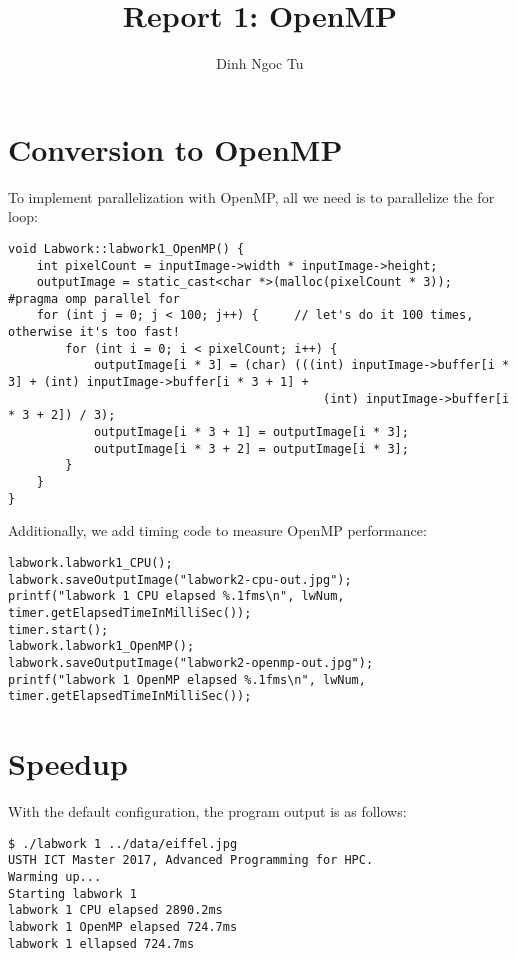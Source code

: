 \documentclass[12pt]{article}
\title{Report 1: OpenMP}
\author{Dinh Ngoc Tu}
\begin{document}
\maketitle


\section{Conversion to OpenMP}

To implement parallelization with OpenMP, all we need is to parallelize the for loop:

\begin{lstlisting}[breaklines]
void Labwork::labwork1_OpenMP() {
    int pixelCount = inputImage->width * inputImage->height;
    outputImage = static_cast<char *>(malloc(pixelCount * 3));
#pragma omp parallel for
    for (int j = 0; j < 100; j++) {     // let's do it 100 times, otherwise it's too fast!
        for (int i = 0; i < pixelCount; i++) {
            outputImage[i * 3] = (char) (((int) inputImage->buffer[i * 3] + (int) inputImage->buffer[i * 3 + 1] +
                                            (int) inputImage->buffer[i * 3 + 2]) / 3);
            outputImage[i * 3 + 1] = outputImage[i * 3];
            outputImage[i * 3 + 2] = outputImage[i * 3];
        }
    }
}
\end{lstlisting}

Additionally, we add timing code to measure OpenMP performance:

\begin{lstlisting}[breaklines]
labwork.labwork1_CPU();
labwork.saveOutputImage("labwork2-cpu-out.jpg");
printf("labwork 1 CPU elapsed %.1fms\n", lwNum, timer.getElapsedTimeInMilliSec());
timer.start();
labwork.labwork1_OpenMP();
labwork.saveOutputImage("labwork2-openmp-out.jpg");
printf("labwork 1 OpenMP elapsed %.1fms\n", lwNum, timer.getElapsedTimeInMilliSec());
\end{lstlisting}


\section{Speedup}

With the default configuration, the program output is as follows:

\begin{lstlisting}[breaklines]
$ ./labwork 1 ../data/eiffel.jpg
USTH ICT Master 2017, Advanced Programming for HPC.
Warming up...
Starting labwork 1
labwork 1 CPU elapsed 2890.2ms
labwork 1 OpenMP elapsed 724.7ms
labwork 1 ellapsed 724.7ms
\end{lstlisting}
\end{document}
